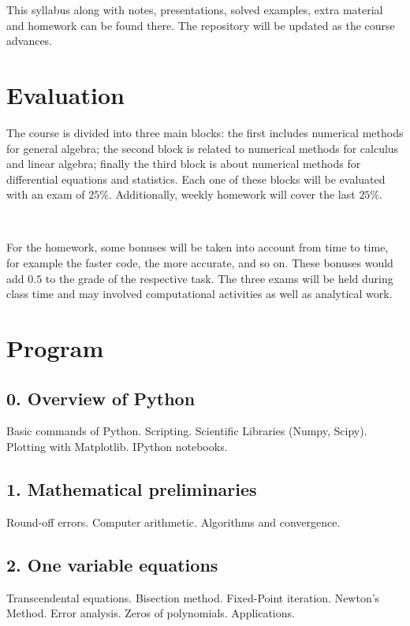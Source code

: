 \documentclass[a4,useAMS,usenatbib,usegraphicx,12pt]{article}
\begin{document}
This syllabus along with notes, presentations, solved examples, extra material
and homework can be found there. The repository will be updated as the
course advances.

\section*{Evaluation}

The course is divided into three main blocks: the first includes numerical
methods for general algebra; the second block is related to numerical methods 
for calculus and linear algebra; finally the third block is about numerical 
methods for differential equations and statistics. Each one of these blocks 
will be evaluated with an exam of $25\%$. Additionally, weekly homework will 
cover the last $25\%$.

\

For the homework, some bonuses will be taken into account from time to time, 
for example the faster code, the more accurate, and so on. These bonuses would 
add $0.5$ to the grade of the respective task. The three exams will be held 
during class time and may involved computational activities as well as analytical 
work.

\newpage
\section*{Program}

\subsection*{0. Overview of Python}
Basic commands of Python. Scripting. Scientific Libraries (Numpy, Scipy). 
Plotting with Matplotlib. IPython notebooks.

\subsection*{1. Mathematical preliminaries}
Round-off errors. Computer arithmetic. Algorithms and convergence.

\subsection*{2. One variable equations}
Transcendental equations. Bisection method. Fixed-Point iteration. Newton's 
Method. Error analysis. Zeros of polynomials. Applications.
\end{document}
